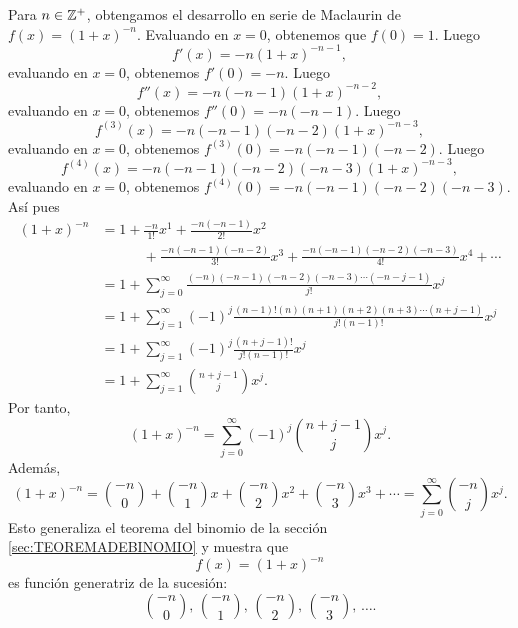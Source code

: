 \begin{myexample}
    Para $n \in \ZZ[+]$, obtengamos el desarrollo en serie de Maclaurin de $f(x) = (1+x)^{-n}$. Evaluando en $x = 0$, obtenemos que $f(0) = 1$. Luego
    $$f'(x) = -n(1 + x)^{-n-1},$$
    evaluando en $x = 0$, obtenemos $f'(0) = -n$. Luego
    $$f''(x) = -n(-n - 1)(1 + x)^{-n-2},$$
    evaluando en $x = 0$, obtenemos $f''(0) = -n(-n-1)$. Luego
    $$f^{(3)}(x) = -n(-n - 1)(-n - 2)(1 + x)^{-n-3},$$
    evaluando en $x = 0$, obtenemos $f^{(3)}(0) = -n(-n - 1)(-n - 2)$. Luego
    $$f^{(4)}(x) = -n(-n - 1)(-n - 2)(-n - 3)(1 + x)^{-n-3},$$
    evaluando en $x = 0$, obtenemos $f^{(4)}(0) = -n(-n - 1)(-n - 2)(-n - 3)$. Así pues
    \begin{align*}
        (1 + x)^{-n} & = 1 + \frac{-n}{1!} x^1 + \frac{-n(-n-1)}{2!} x^2 \\
        & \quad\quad\quad + \frac{-n(-n-1)(-n-2)}{3!} x^3 + \frac{-n(-n-1)(-n-2)(-n-3)}{4!} x^4 + \cdots \\
        & = 1 + \sum_{j=0}^{\infty} \frac{(-n)(-n-1)(-n-2)(-n-3) \cdots (-n-j-1)}{j!} x^j \\
        & = 1 + \sum_{j=1}^{\infty} (-1)^j \frac{(n-1)!(n)(n+1)(n+2)(n+3) \cdots (n+j-1)}{j!(n-1)!} x^j \\
        & = 1 + \sum_{j=1}^{\infty} (-1)^j \frac{(n+j-1)!}{j!(n-1)!} x^j \\
        & = 1 + \sum_{j=1}^{\infty} \binom{n+j-1}{j} x^j.
    \end{align*}
    Por tanto,
    $$(1 + x)^{-n} = \sum_{j=0}^{\infty} (-1)^j \binom{n+j-1}{j} x^j.$$
    Además,
    $$(1 + x)^{-n} = \binom{-n}{0} + \binom{-n}{1} x + \binom{-n}{2} x^2 + \binom{-n}{3} x^3 + \cdots = \sum_{j=0}^{\infty} \binom{-n}{j} x^j.$$
    Esto generaliza el teorema del binomio de la sección \ref{sec:TEOREMADEBINOMIO} y muestra que
    $$f(x) = (1 + x)^{-n}$$
    es función generatriz de la sucesión:
    $$\binom{-n}{0}, \, \binom{-n}{1}, \,  \binom{-n}{2}, \, \binom{-n}{3}, \, \dots.$$
\end{myexample}

\newpage

